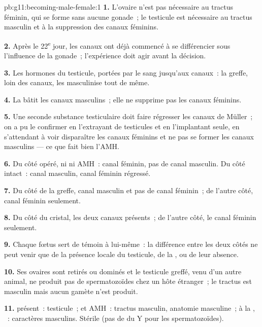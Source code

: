 \begin{solution}{pb:g11:becoming-male-female:1}
\textbf{1.} L'ovaire n'est pas nécessaire au tractus féminin, qui se
forme sans aucune gonade~; le testicule est nécessaire au tractus
masculin et à la suppression des canaux féminins.

\textbf{2.} Après le 22\textsuperscript{e} jour, les canaux ont déjà
commencé à se différencier sous l'influence de la gonade~; l'expérience
doit agir avant la décision.

\textbf{3.} Les hormones du testicule, portées par le sang jusqu'aux
canaux~: la greffe, loin des canaux, les masculinise tout de même.

\textbf{4.} La  bâtit les canaux masculins~; elle ne
supprime pas les canaux féminins.

\textbf{5.} Une seconde substance testiculaire doit faire régresser les
canaux de Müller~; on a pu le confirmer en l'extrayant de testicules et
en l'implantant seule, en s'attendant à voir disparaître les canaux
féminins et ne pas se former les canaux masculins --- ce que fait bien
l'AMH.

\textbf{6.} Du côté opéré, ni  ni AMH~: canal féminin, pas
de canal masculin. Du côté intact~: canal masculin, canal féminin
régressé.

\textbf{7.} Du côté de la greffe, canal masculin et pas de canal
féminin~; de l'autre côté, canal féminin seulement.

\textbf{8.} Du côté du cristal, les deux canaux présents~; de l'autre
côté, le canal féminin seulement.

\textbf{9.} Chaque fœtus sert de témoin à lui-même~: la différence
entre les deux côtés ne peut venir que de la présence locale du
testicule, de la , ou de leur absence.

\textbf{10.} Ses ovaires sont retirés ou dominés et le testicule
greffé, venu d'un autre animal, ne produit pas de spermatozoïdes chez
un hôte étranger~; le tractus est masculin mais aucun gamète n'est
produit.

\textbf{11.}  présent~: testicule~;  et AMH~: tractus
masculin, anatomie masculine~; à la , ~: caractères
masculins. Stérile (pas de  du Y pour les spermatozoïdes).


\end{solution}

